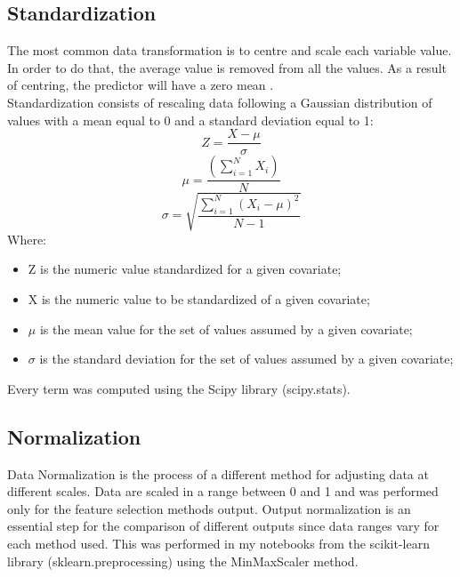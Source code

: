\subsection{Standardization}
The most common data transformation is to centre and scale each variable value. In order to do that, the average value is removed from all the values. As a result of centring, the predictor will have a zero mean \cite{kuhn2013applied}.\\
Standardization consists of rescaling data following a Gaussian distribution of values with a mean equal to 0 and a standard deviation equal to 1:
\begin{equation}
  Z = \frac{X-\mu}{\sigma}
\end{equation}
\begin{equation}
\mu = \frac{(\sum_{i=1}^{N} X_i)}{N}
\end{equation}
\begin{equation}
\sigma = \sqrt{\frac{\sum_{i=1}^{N} (X_i-\mu)^{2}}{N-1}}
\end{equation}
Where:
\begin{itemize}
\item Z is the numeric value standardized for a given covariate;
\item X is the numeric value to be standardized of a given covariate;
\item $\mu$ is the mean value for the set of values assumed by a given covariate;
\item $\sigma$ is the standard deviation for the set of values assumed by a given covariate;
\end{itemize}
Every term was computed using the Scipy library (scipy.stats). 
\bigbreak
\subsection{Normalization}
Data Normalization is the process of a different method for adjusting data at different scales. Data are scaled in a range between 0 and 1 and was performed only for the feature selection methods output.
Output normalization is an essential step for the comparison of different outputs since data ranges vary for each method used.\newline
This was performed in my notebooks from the scikit-learn library (sklearn.preprocessing) using the MinMaxScaler method.
